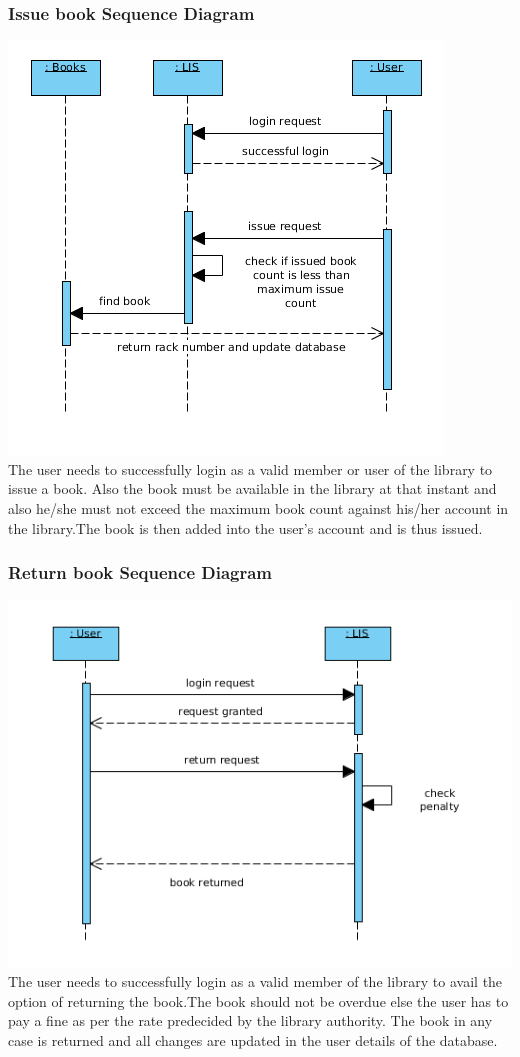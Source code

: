 \documentclass[a4paper]{article}
\begin{document}
\subsubsection*{Issue book Sequence Diagram}
\includegraphics[scale=0.50]{images/seqDiagIssueBook.png}
\\
The user needs to successfully login as a valid member or user of the library to issue a book. Also the book must be available in the library at that instant and also he/she must not exceed the maximum book count against his/her account in the library.The book is then added into the user's account and is thus issued.\\

\subsubsection*{Return book Sequence Diagram}
\includegraphics[scale=0.50]{images/seqDiagReturnBook.png}
\\
The user needs to successfully login as a valid member of the library to avail the option of returning the book.The book should not be overdue else the user has to pay a fine as per the rate predecided by the library authority. The book in any case is returned and all changes are updated in the user details of the database.
\\
\end{document}
